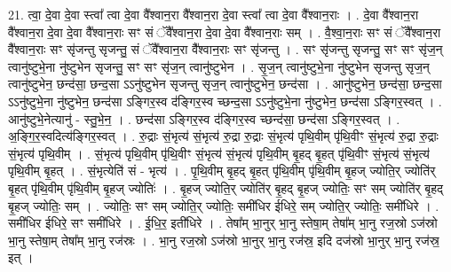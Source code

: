 \documentclass[17pt]{extarticle}
\begin{document}
21. त्वा॒ दे॒वा दे॒वा स्त्वा᳚ त्वा दे॒वा वै᳚श्वान॒रा वै᳚श्वान॒रा दे॒वा स्त्वा᳚ त्वा दे॒वा वै᳚श्वान॒राः । . दे॒वा वै᳚श्वान॒रा वै᳚श्वान॒रा दे॒वा दे॒वा वै᳚श्वान॒राः सꣳ सं ॅवै᳚श्वान॒रा दे॒वा दे॒वा वै᳚श्वान॒राः सम् । . वै॒श्वा॒न॒राः सꣳ सं ॅवै᳚श्वान॒रा वै᳚श्वान॒राः सꣳ सृ॑जन्तु सृजन्तु॒ सं ॅवै᳚श्वान॒रा वै᳚श्वान॒राः सꣳ सृ॑जन्तु । . सꣳ सृ॑जन्तु सृजन्तु॒ सꣳ सꣳ सृ॑ज॒न् त्वानु॑ष्टुभे॒ना नु॑ष्टुभेन सृजन्तु॒ सꣳ सꣳ सृ॑ज॒न् त्वानु॑ष्टुभेन । . सृ॒ज॒न् त्वानु॑ष्टुभे॒ना नु॑ष्टुभेन सृजन्तु सृज॒न् त्वानु॑ष्टुभेन॒ छन्द॑सा॒ छन्द॒सा ऽऽनु॑ष्टुभेन सृजन्तु सृज॒न् त्वानु॑ष्टुभेन॒ छन्द॑सा । . आनु॑ष्टुभेन॒ छन्द॑सा॒ छन्द॒सा ऽऽनु॑ष्टुभे॒ना नु॑ष्टुभेन॒ छन्द॑सा ऽङ्गिर॒स्व द॑ङ्गिर॒स्व च्छन्द॒सा ऽऽनु॑ष्टुभे॒ना नु॑ष्टुभेन॒ छन्द॑सा ऽङ्गिर॒स्वत् । . आनु॑ष्टुभे॒नेत्यानु॑ - स्तु॒भे॒न॒ । . छन्द॑सा ऽङ्गिर॒स्व द॑ङ्गिर॒स्व च्छन्द॑सा॒ छन्द॑सा ऽङ्गिर॒स्वत् । . अ॒ङ्गि॒र॒स्वदित्य॑ङ्गिर॒स्वत् । . रु॒द्राः सं॒भृत्य॑ सं॒भृत्य॑ रु॒द्रा रु॒द्राः सं॒भृत्य॑ पृथि॒वीम् पृ॑थि॒वीꣳ सं॒भृत्य॑ रु॒द्रा रु॒द्राः सं॒भृत्य॑ पृथि॒वीम् । . सं॒भृत्य॑ पृथि॒वीम् पृ॑थि॒वीꣳ सं॒भृत्य॑ सं॒भृत्य॑ पृथि॒वीम् बृ॒हद् बृ॒हत् पृ॑थि॒वीꣳ सं॒भृत्य॑ सं॒भृत्य॑ पृथि॒वीम् बृ॒हत् । . सं॒भृत्येति॑ सं - भृत्य॑ । . पृ॒थि॒वीम् बृ॒हद् बृ॒हत् पृ॑थि॒वीम् पृ॑थि॒वीम् बृ॒हज् ज्योति॒र् ज्योति॑र् बृ॒हत् पृ॑थि॒वीम् पृ॑थि॒वीम् बृ॒हज् ज्योतिः॑ । . बृ॒हज् ज्योति॒र् ज्योति॑र् बृ॒हद् बृ॒हज् ज्योतिः॒ सꣳ सम् ज्योति॑र् बृ॒हद् बृ॒हज् ज्योतिः॒ सम् । . ज्योतिः॒ सꣳ सम् ज्योति॒र् ज्योतिः॒ समी॑धिर ईधिरे॒ सम् ज्योति॒र् ज्योतिः॒ समी॑धिरे । . समी॑धिर ईधिरे॒ सꣳ समी॑धिरे । . ई॒धि॒र॒ इती॑धिरे । . तेषा᳚म् भा॒नुर् भा॒नु स्तेषा॒म् तेषा᳚म् भा॒नु रज॒स्रो ऽज॑स्रो भा॒नु स्तेषा॒म् तेषा᳚म् भा॒नु रज॑स्रः । . भा॒नु रज॒स्रो ऽज॑स्रो भा॒नुर् भा॒नु रज॑स्र॒ इदि दज॑स्रो भा॒नुर् भा॒नु रज॑स्र॒ इत् । \newline
\end{document}
